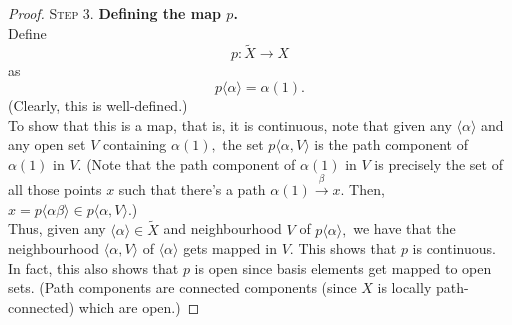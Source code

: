 \documentclass[12pt]{article}
\begin{document}
\begin{proof}
\textsc{Step 3.} \textbf{Defining the map $p$.}\\
Define
\begin{equation*} 
	p:\tilde{X} \to X
\end{equation*}
as
\begin{equation*} 
	p\langle \alpha\rangle = \alpha(1).
\end{equation*}
(Clearly, this is well-defined.)\\
To show that this is a map, that is, it is continuous, note that given any $\langle \alpha\rangle$ and any open set $V$ containing $\alpha(1),$ the set $p\langle \alpha, V\rangle$ is the path component of $\alpha(1)$ in $V.$ (Note that the path component of $\alpha(1)$ in $V$ is precisely the set of all those points $x$ such that there's a path $\alpha(1) \overset{\beta}{\longrightarrow}x.$ Then, $x = p\langle \alpha\beta\rangle \in p\langle \alpha, V\rangle.$)\\
Thus, given any $\langle \alpha\rangle \in \tilde{X}$ and neighbourhood $V$ of $p\langle \alpha\rangle,$ we have that the neighbourhood $\langle \alpha, V\rangle$ of $\langle \alpha\rangle$ gets mapped in $V.$ This shows that $p$ is continuous. In fact, this also shows that $p$ is open since basis elements get mapped to open sets. (Path components are connected components (since $X$ is locally path-connected) which are open.)

\dotfill


\end{proof}
\end{document}
